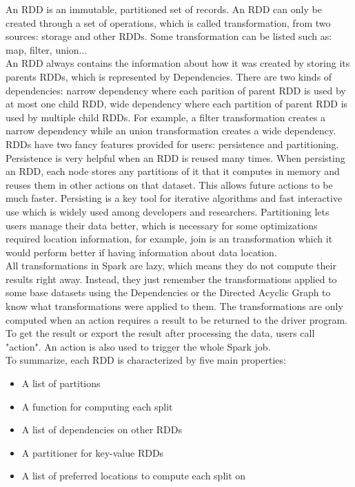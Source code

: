 An RDD is an immutable, partitioned set of records. An RDD can only be created through a set of operations, which is called transformation, from two sources: storage and other RDDs. Some transformation can be listed such as: map, filter, union...\\
An RDD always contains the information about how it was created by storing its parents RDDs, which is represented by Dependencies. There are two kinds of dependencies: narrow dependency where each parition of parent RDD is used by at most one child RDD, wide dependency where each partition of parent RDD is used by multiple child RDDs. For example, a filter transformation creates a narrow dependency while an union transformation creates a wide dependency.\\
RDDs have two fancy features provided for users: persistence and partitioning. Persistence is very helpful when an RDD is reused many times. When persisting an RDD, each node stores any partitions of it that it computes in memory and reuses them in other actions on that dataset. This allows future actions to be much faster. Persisting is a key tool for iterative algorithms and fast interactive use which is widely used among developers and researchers. Partitioning lets users manage their data better, which is necessary for some optimizations required location information, for example, join is an transformation which it would perform better if having information about data location.\\

All transformations in Spark are lazy, which means they do not compute their results right away. Instead, they just remember the transformations applied to some base datasets using the Dependencies or the Directed Acyclic Graph to know what transformations were applied to them. The transformations are only computed when an action requires a result to be returned to the driver program.\\

To get the result or export the result after processing the data, users call "action". An action is also used to trigger the whole Spark job.\\

To summarize, each RDD is characterized by five main properties:
\begin{itemize}
\item A list of partitions
\item A function for computing each split
\item A list of dependencies on other RDDs
\item A partitioner for key-value RDDs
\item A list of preferred locations to compute each split on
\end{itemize}

